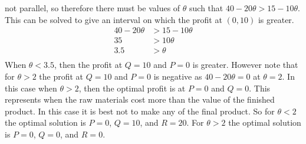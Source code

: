 \documentclass[11pt, oneside]{article}
\begin{document}
\begin{enumerate}
\begin{enumerate}
        not parallel, so therefore there must be values of $\theta$ such that
        $40 - 20\theta > 15 - 10\theta$.
        This can be solved to give an interval on which the profit at $(0, 10)$
        is greater.
        \begin{align*}
          40 - 20\theta &> 15 - 10\theta \\
          35 &> 10\theta \\
          3.5 &> \theta \\
        \end{align*}
        When $\theta < 3.5$, then the profit at $Q = 10$ and $P = 0$ is greater.
        However note that for $\theta > 2$ the profit at $Q = 10$ and $P = 0$
        is negative as $40 - 20\theta = 0$ at $\theta = 2$.
        In this case when $\theta > 2$, then the optimal profit is at $P = 0$
        and $Q = 0$.
        This represents when the raw materials cost more than the value of the
        finished product.
        In this case it is best not to make any of the final product.
        So for $\theta < 2$ the optimal solution is $P = 0$, $Q = 10$, and
        $R = 20$.
        For $\theta > 2$ the optimal solution is $P = 0$, $Q = 0$, and
        $R = 0$.
    \end{enumerate}
\end{enumerate}
\end{document}
